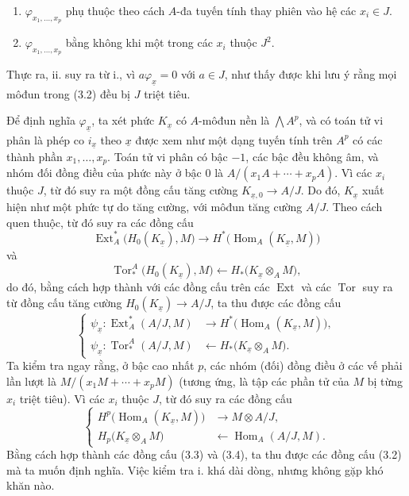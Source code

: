 \documentclass[11pt,twoside,openany]{book}
\numberwithin{equation}{section}
\newcommand{\src}[1]{%
  \phantomsection\hypertarget{src:\fgasourceid:#1}{}%
  \marginpar{\raggedleft\footnotesize\sffamily #1}%
}
\newcommand{\fgasourceid}{unset}
\begin{document}
\src{174}
\begin{enumerate}
\item[\textup{i.}] $\varphi_{x_1,\ldots,x_p}$ phụ thuộc theo cách
$A$-đa tuyến tính thay phiên vào hệ các $x_i\in J$.
\item[\textup{ii.}] $\varphi_{x_1,\ldots,x_p}$ bằng không khi một trong các $x_i$ thuộc
$J^{2}$.
\end{enumerate}
Thực ra, ii. suy ra từ i., vì $a\varphi_{\underline{x}}=0$ với $a\in J$,
như thấy được khi lưu ý rằng mọi môđun trong (3.2) đều bị
$J$ triệt tiêu.

Để định nghĩa $\varphi_{\underline{x}}$, ta xét phức
$K_{\underline{x}}$ có $A$-môđun nền là $\bigwedge A^{p}$, và
có toán tử vi phân là phép co $i_{\underline{x}}$ theo
$\underline{x}$ được xem như một dạng tuyến tính trên $A^{p}$ có các thành phần
$x_1,\ldots,x_p$. Toán tử vi phân có bậc $-1$, các bậc đều
không âm, và nhóm đối đồng điều của phức này ở bậc $0$ là
$A/(x_1A+\cdots+x_pA)$. Vì các $x_i$ thuộc $J$, từ đó suy ra một
đồng cấu tăng cường $K_{\underline{x},0}\longrightarrow A/J$. Do đó,
$K_{\underline{x}}$ xuất hiện như một phức tự do tăng cường, với môđun
tăng cường $A/J$. Theo cách quen thuộc, từ đó suy ra các đồng cấu
\[
\operatorname{Ext}_{A}^{*}\bigl(H_0(K_{\underline{x}}),M\bigr)
\longrightarrow
H^{*}\bigl(\operatorname{Hom}_{A}(K_{\underline{x}},M)\bigr)
\]
và
\[
\operatorname{Tor}_{*}^{A}\bigl(H_0(K_{\underline{x}}),M\bigr)
\longleftarrow
H_{*}\bigl(K_{\underline{x}}\otimes_A M\bigr),
\]
do đó, bằng cách hợp thành với các đồng cấu trên các $\operatorname{Ext}$ và các
$\operatorname{Tor}$ suy ra từ đồng cấu tăng cường
$H_0(K_{\underline{x}})\longrightarrow A/J$, ta thu được các đồng cấu
\begin{equation}\tag{3.3}
\left\{
\begin{aligned}
\psi_{\underline{x}}:
\operatorname{Ext}_{A}^{*}(A/J,M)
&\longrightarrow H^{*}\bigl(\operatorname{Hom}_{A}(K_{\underline{x}},M)\bigr),\\
\psi_{\underline{x}}:
\operatorname{Tor}_{*}^{A}(A/J,M)
&\longleftarrow H_{*}\bigl(K_{\underline{x}}\otimes_A M\bigr).
\end{aligned}
\right.
\end{equation}
Ta kiểm tra ngay rằng, ở bậc cao nhất $p$, các nhóm (đối) đồng điều ở các vế
phải lần lượt là $M/(x_1M+\cdots+x_pM)$ (tương ứng, là tập các phần tử của $M$
bị từng $x_i$ triệt tiêu). Vì các $x_i$ thuộc $J$, từ đó suy ra các
đồng cấu
\begin{equation}\tag{3.4}
\left\{
\begin{aligned}
H^{p}\bigl(\operatorname{Hom}_{A}(K_{\underline{x}},M)\bigr)
&\longrightarrow M\otimes A/J,\\
H_{p}\bigl(K_{\underline{x}}\otimes_A M\bigr)
&\longleftarrow\operatorname{Hom}_{A}(A/J,M).
\end{aligned}
\right.
\end{equation}
Bằng cách hợp thành các đồng cấu (3.3) và (3.4), ta thu được các đồng cấu (3.2)
mà ta muốn định nghĩa. Việc kiểm tra i. khá dài dòng, nhưng không
gặp khó khăn nào.
\end{document}
